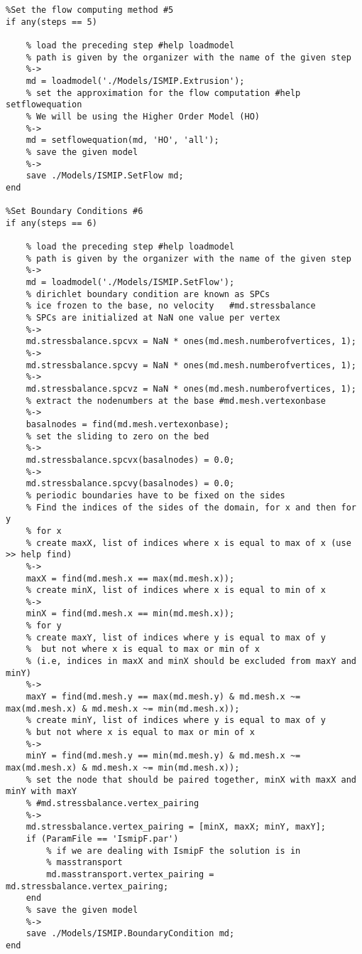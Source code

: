 \begin{lstlisting}
%Set the flow computing method #5
if any(steps == 5)

	% load the preceding step #help loadmodel
	% path is given by the organizer with the name of the given step
	%->
	md = loadmodel('./Models/ISMIP.Extrusion');
	% set the approximation for the flow computation #help setflowequation
	% We will be using the Higher Order Model (HO)
	%->
	md = setflowequation(md, 'HO', 'all');
	% save the given model
	%->
	save ./Models/ISMIP.SetFlow md;
end

%Set Boundary Conditions #6
if any(steps == 6)

	% load the preceding step #help loadmodel
	% path is given by the organizer with the name of the given step
	%->
	md = loadmodel('./Models/ISMIP.SetFlow');
	% dirichlet boundary condition are known as SPCs
	% ice frozen to the base, no velocity	#md.stressbalance
	% SPCs are initialized at NaN one value per vertex
	%->
	md.stressbalance.spcvx = NaN * ones(md.mesh.numberofvertices, 1);
	%->
	md.stressbalance.spcvy = NaN * ones(md.mesh.numberofvertices, 1);
	%->
	md.stressbalance.spcvz = NaN * ones(md.mesh.numberofvertices, 1);
	% extract the nodenumbers at the base #md.mesh.vertexonbase
	%->
	basalnodes = find(md.mesh.vertexonbase);
	% set the sliding to zero on the bed
	%->
	md.stressbalance.spcvx(basalnodes) = 0.0;
	%->
	md.stressbalance.spcvy(basalnodes) = 0.0;
	% periodic boundaries have to be fixed on the sides
	% Find the indices of the sides of the domain, for x and then for y
	% for x
	% create maxX, list of indices where x is equal to max of x (use >> help find)
	%->
	maxX = find(md.mesh.x == max(md.mesh.x));
	% create minX, list of indices where x is equal to min of x
	%->
	minX = find(md.mesh.x == min(md.mesh.x));
	% for y
	% create maxY, list of indices where y is equal to max of y
	%  but not where x is equal to max or min of x
	% (i.e, indices in maxX and minX should be excluded from maxY and minY)
	%->
	maxY = find(md.mesh.y == max(md.mesh.y) & md.mesh.x ~= max(md.mesh.x) & md.mesh.x ~= min(md.mesh.x));
	% create minY, list of indices where y is equal to max of y
	% but not where x is equal to max or min of x
	%->
	minY = find(md.mesh.y == min(md.mesh.y) & md.mesh.x ~= max(md.mesh.x) & md.mesh.x ~= min(md.mesh.x));
	% set the node that should be paired together, minX with maxX and minY with maxY
	% #md.stressbalance.vertex_pairing
	%->
	md.stressbalance.vertex_pairing = [minX, maxX; minY, maxY];
	if (ParamFile == 'IsmipF.par')
		% if we are dealing with IsmipF the solution is in
		% masstransport
		md.masstransport.vertex_pairing = md.stressbalance.vertex_pairing;
	end
	% save the given model
	%->
	save ./Models/ISMIP.BoundaryCondition md;
end


\end{lstlisting}
